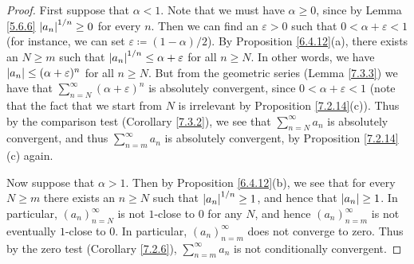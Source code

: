 \begin{proof}
First suppose that \(\alpha < 1\).
Note that we must have \(\alpha \geq 0\), since by Lemma \ref{5.6.6} \(\abs*{a_n}^{1 / n} \geq 0\) for every \(n\).
Then we can find an \(\varepsilon > 0\) such that \(0 < \alpha + \varepsilon < 1\) (for instance, we can set \(\varepsilon \coloneqq (1 - \alpha) / 2\)).
By Proposition \ref{6.4.12}(a), there exists an \(N \geq m\) such that \(\abs*{a_n}^{1 / n} \leq \alpha + \varepsilon\) for all \(n \geq N\).
In other words, we have \(\abs*{a_n} \leq (\alpha + \varepsilon)^n\) for all \(n \geq N\).
But from the geometric series (Lemma \ref{7.3.3}) we have that \(\sum_{n = N}^\infty (\alpha + \varepsilon)^n\) is absolutely convergent, since \(0 < \alpha + \varepsilon < 1\)
(note that the fact that we start from \(N\) is irrelevant by Proposition \ref{7.2.14}(c)).
Thus by the comparison test (Corollary \ref{7.3.2}), we see that \(\sum_{n = N}^\infty a_n\) is absolutely convergent, and thus \(\sum_{n = m}^\infty a_n\) is absolutely convergent, by Proposition \ref{7.2.14}(c) again.

Now suppose that \(\alpha > 1\).
Then by Proposition \ref{6.4.12}(b), we see that for every \(N \geq m\) there exists an \(n \geq N\) such that \(\abs*{a_n}^{1 / n} \geq 1\), and hence that \(\abs*{a_n} \geq 1\).
In particular, \((a_n)_{n = N}^\infty\) is not \(1\)-close to \(0\) for any \(N\), and hence \((a_n)_{n = m}^\infty\) is not eventually \(1\)-close to \(0\).
In particular, \((a_n)_{n = m}^\infty\) does not converge to zero.
Thus by the zero test (Corollary \ref{7.2.6}), \(\sum_{n = m}^\infty a_n\) is not conditionally convergent.


\end{proof}
